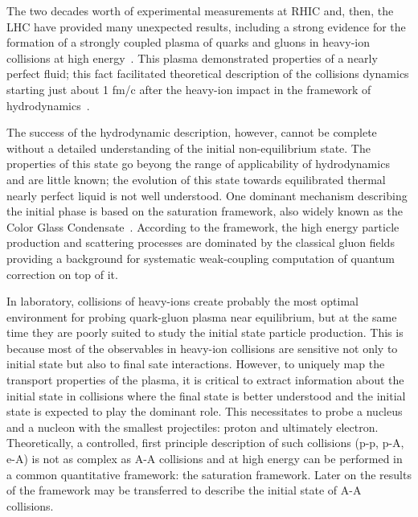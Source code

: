 The two decades worth of experimental
measurements at RHIC and, then, the LHC 
have provided many unexpected results, including 
a strong evidence for the formation of 
a strongly coupled plasma of quarks and gluons in
heavy-ion collisions at high energy~\cite{Shuryak:2003xe,Shuryak:2004cy,Adams:2005dq,Song:2010mg}. 
This plasma  
demonstrated properties of a nearly perfect fluid; 
this fact facilitated  theoretical description 
of the collisions dynamics starting just  about 1 fm/c after the heavy-ion impact 
in the framework of hydrodynamics~\cite{Schafer:2009dj,Song:2010mg,Romatschke:2017ejr}.   

The success of the hydrodynamic description, however, cannot be complete 
without a detailed understanding of the initial 
non-equilibrium state. The properties of this state go beyong the range of applicability 
of hydrodynamics and  are little known; 
the evolution of this state towards equilibrated 
thermal nearly perfect liquid  is not well understood. 
One dominant mechanism describing the initial phase is 
based on the saturation framework, also widely known as 
the Color Glass Condensate~\cite{Iancu:2002xk,Albacete:2014fwa,KovchegovLevin}. According to the framework, the 
high energy particle production and scattering processes are 
dominated by the classical gluon fields providing a 
background for systematic weak-coupling 
computation of quantum correction on top of it.  

In laboratory, 
collisions of heavy-ions create probably the most optimal envi\-ronment for 
probing quark-gluon plasma near equilibrium, but 
at the same time they are poorly suited to study the 
initial state particle production. This is because 
most of the observables in heavy-ion collisions are 
sensitive not only to  initial state but also 
to  final sate interactions. However, to uniquely map the transport properties 
of the plasma, it is critical to extract information 
about the initial state in collisions where 
the final state is better understood and the 
initial state is expected to play the dominant role.
This necessitates to probe a nucleus  and a nucleon with the smallest projectiles: 
proton and ultimately electron. 
Theoretically, a controlled,  first principle description of such collisions (p-p, p-A, e-A) 
is not as complex as A-A collisions 
and at high energy can be performed in a common quantitative framework: the saturation framework. 
Later on the results of the framework may be transferred to describe the initial state of A-A collisions. 


